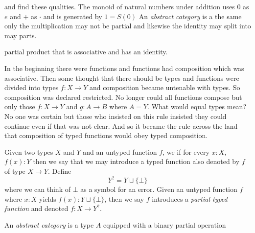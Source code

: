 \documentclass[12pt,twoside,letterpaper]{memoir}
\begin{document}
and find these qualities.  The monoid of natural numbers under addition uses $0$ as 
$e$ and $+$ as $\cdot$ and is generated by $1=S(0)$
An \emph{abstract category} is a the same only the multiplication may not be 
partial and likewise the identity may split into may parts.

partial product that is associative and has an identity.



In the beginning there were functions and functions had composition
which was associative.  Then some thought that there should be types 
and functions were divided into types $f:X\to Y$ and composition became 
untenable with types.  So composition was declared restricted.  
No longer could all functions compose but only those $f:X\to Y$ 
and $g:A\to B$ where $A=Y$.  What would equal types mean?  No one 
was certain but those who insisted on this rule insisted they could 
continue even if that was not clear.  And so it became the rule across 
the land that composition of typed functions would obey typed composition.

Given two types $X$ and $Y$ and an untyped function $f$, we if 
for every $x:X$, $f(x):Y$ then we say that we may introduce a typed function 
also denoted by $f$ of type $X\to Y$.  Define 
\[
    Y^? = Y\sqcup \{\bot\}
\]
where we can think of $\bot$ as a symbol for an error.  Given an untyped 
function $f$ where $x:X$ yields $f(x):Y\sqcup\{\bot\}$, then we say $f$ 
introduces a \emph{partial typed function} and denoted $f:X\to Y^?$.

An \emph{abstract category} is a type $A$ equipped with a binary 
partial operation 
\end{document}
